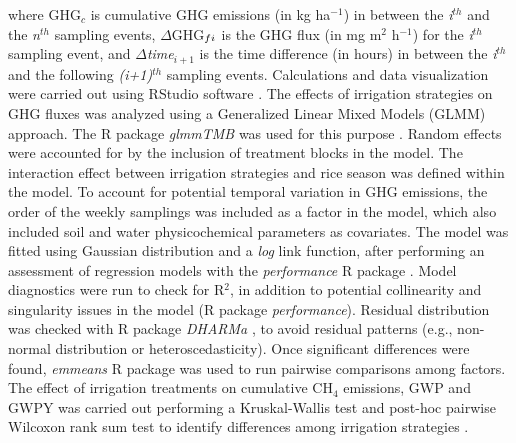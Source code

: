 where GHG$_{c}$ is cumulative GHG emissions (in kg ha$^{-1}$) in between the \textit{i$^{th}$} and the \textit{n$^{th}$} sampling events, $\Delta$GHG$_{f \space i}$ is the GHG flux (in mg m$^{2}$ h$^{-1}$) for the \textit{i$^{th}$} sampling event, and $\Delta$\textit{time$_{i+1}$} is the time difference (in hours) in between the \textit{i$^{th}$} and the following \textit{(i+1)$^{th}$} sampling events. Calculations and data visualization were carried out using RStudio software \citep{team2020integrated}. The effects of irrigation strategies on GHG fluxes was analyzed using a Generalized Linear Mixed Models (GLMM) approach. The R package \textit{glmmTMB} was used for this purpose \citep{bolker2019getting}. Random effects were accounted for by the inclusion of treatment blocks in the model. The interaction effect between irrigation strategies and rice season was defined within the model. To account for potential temporal variation in GHG emissions, the order of the weekly samplings was included as a factor in the model, which also included soil and water physicochemical parameters as covariates. The model was fitted using Gaussian distribution and a \textit{log} link function, after performing an assessment of regression models with the \textit{performance} R package \citep{ludecke2021performance}. Model diagnostics were run to check for R$^{2}$, in addition to potential collinearity and singularity issues in the model (R package \textit{performance}). Residual distribution was checked with R package \textit{DHARMa} \citep{dharm2020residual}, to avoid residual patterns (e.g., non-normal distribution or heteroscedasticity). Once significant differences were found, \textit{emmeans} R package \citep{lenth2019emmeans} was used to run pairwise comparisons among factors. The effect of irrigation treatments on cumulative CH$_{4}$ emissions, GWP and GWPY was carried out performing a Kruskal-Wallis test and post-hoc pairwise Wilcoxon rank sum test to identify differences among irrigation strategies \citep{wust-galley2023}.\\

